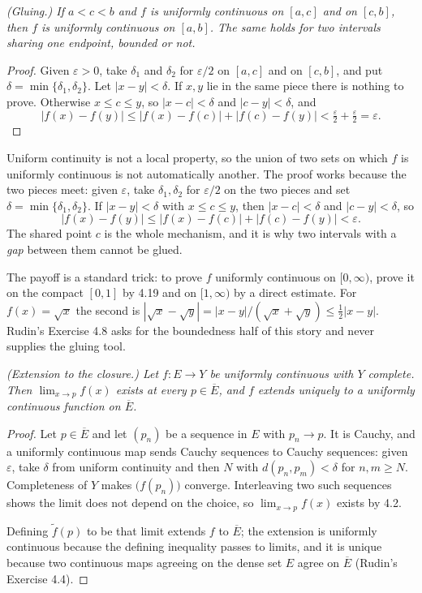 \emph{(Gluing.) If $a < c < b$ and $f$ is uniformly continuous on $[a,c]$
and on $[c,b]$, then $f$ is uniformly continuous on $[a,b]$. The same holds
for two intervals sharing one endpoint, bounded or not.}
\begin{proof}
Given $\varepsilon>0$, take $\delta_1$ and $\delta_2$ for $\varepsilon/2$ on
$[a,c]$ and on $[c,b]$, and put $\delta = \min\{\delta_1,\delta_2\}$. Let
$|x-y|<\delta$. If $x,y$ lie in the same piece there is nothing to prove.
Otherwise $x \le c \le y$, so $|x-c|<\delta$ and $|c-y|<\delta$, and
\[ |f(x)-f(y)| \le |f(x)-f(c)| + |f(c)-f(y)|
   < \tfrac{\varepsilon}{2}+\tfrac{\varepsilon}{2} = \varepsilon . \]
\end{proof}

\begin{unpack}
Uniform continuity is not a local property, so the union of two sets on which
$f$ is uniformly continuous is not automatically another. The proof works
because the two pieces meet: given $\varepsilon$, take $\delta_1,\delta_2$
for $\varepsilon/2$ on the two pieces and set
$\delta = \min\{\delta_1,\delta_2\}$. If $|x-y| < \delta$ with $x \le c \le
y$, then $|x-c| < \delta$ and $|c-y| < \delta$, so
\[ |f(x)-f(y)| \le |f(x)-f(c)| + |f(c)-f(y)| < \varepsilon . \]
The shared point $c$ is the whole mechanism, and it is why two intervals
with a \emph{gap} between them cannot be glued.

The payoff is a standard trick: to prove $f$ uniformly continuous on
$[0,\infty)$, prove it on the compact $[0,1]$ by 4.19 and on $[1,\infty)$ by
a direct estimate. For $f(x)=\sqrt x$ the second is
$|\sqrt x - \sqrt y| = |x-y|/(\sqrt x+\sqrt y) \le \tfrac12|x-y|$. Rudin's
Exercise 4.8 asks for the boundedness half of this story and never supplies
the gluing tool.
\end{unpack}

\emph{(Extension to the closure.) Let $f : E \to Y$ be uniformly continuous
with $Y$ complete. Then $\lim_{x\to p} f(x)$ exists at every $p \in
\overline E$, and $f$ extends uniquely to a uniformly continuous function on
$\overline E$.}
\begin{proof}
Let $p \in \overline E$ and let $(p_n)$ be a sequence in $E$ with
$p_n \to p$. It is Cauchy, and a uniformly continuous map sends Cauchy
sequences to Cauchy sequences: given $\varepsilon$, take $\delta$ from
uniform continuity and then $N$ with $d(p_n,p_m)<\delta$ for $n,m\ge N$.
Completeness of $Y$ makes $\bigl(f(p_n)\bigr)$ converge. Interleaving two
such sequences shows the limit does not depend on the choice, so
$\lim_{x\to p}f(x)$ exists by 4.2.

Defining $\tilde f(p)$ to be that limit extends $f$ to $\overline E$; the
extension is uniformly continuous because the defining inequality passes to
limits, and it is unique because two continuous maps agreeing on the dense
set $E$ agree on $\overline E$ (Rudin's Exercise 4.4).
\end{proof}

